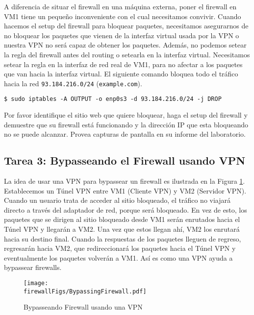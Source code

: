 A diferencia de situar el firewall en una máquina externa, poner el firewall en VM1 tiene un pequeño inconveniente con el cual necesitamos convivir. Cuando hacemos el setup del firewall para bloquear paquetes, necesitamos asegurarnos de no bloquear los paquetes que vienen de la interfaz virtual usada por la VPN o nuestra VPN no será capaz de obtener los paquetes. Además, no podemos setear la regla del firewall antes del routing o setearla  en la interfaz virtual. Necesitamos setear la regla en la interfaz de red real de VM1, para no afectar a los paquetes que van hacia la interfaz virtual. El siguiente comando bloquea todo el tráfico hacia la red \texttt{93.184.216.0/24}  (\texttt{example.com}).


\begin{lstlisting}
$ sudo iptables -A OUTPUT -o enp0s3 -d 93.184.216.0/24 -j DROP
\end{lstlisting}

Por favor identifique el sitio web que quiere bloquear, haga el setup del firewall y demuestre que su firewall está funcionando y la dirección IP que esta bloqueando no se puede alcanzar. Provea capturas de pantalla en su informe del laboratorio.

\subsection{Tarea 3: Bypasseando el Firewall usando VPN}

La idea de usar una VPN para bypassear un firewall es ilustrada en la Figura \ref{vpn_firewall:fig:bypassing}. 
Establecemos un Túnel VPN entre VM1 (Cliente VPN) y VM2 (Servidor VPN).
Cuando un usuario trata de acceder al sitio bloqueado, el tráfico no viajará directo a través del adaptador de red, porque será bloqueado. En vez de esto, los paquetes que se dirigen al sitio bloqueado desde VM1 serán enrutados hacia el Túnel VPN y llegarán a VM2. Una vez que estos llegan ahí, VM2 los enrutará hacia su destino final.
Cuando la respuestas de los paquetes lleguen de regreso, regresarán hacia VM2, que redireccionará los paquetes hacia el Túnel VPN y eventualmente los paquetes volverán a VM1. Así es como una VPN ayuda a bypassear firewalls.

\begin{figure}[htb]
\begin{center}
\texttt{[image: \\firewallFigs/BypassingFirewall.pdf]}
\end{center}
\caption{Bypasseando Firewall usando una VPN}
\label{vpn_firewall:fig:bypassing}
\end{figure}
 
